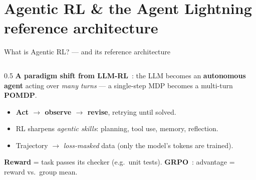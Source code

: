 \documentclass[aspectratio=169]{beamer}
\begin{document}
\section{Agentic RL \& the Agent Lightning reference architecture}

\begin{frame}{What is Agentic RL? --- and its reference architecture}
  \begin{columns}[T]
    \begin{column}{0.5\textwidth}
      \footnotesize
      \textbf{A paradigm shift from LLM-RL}~\cite{agenticrl}: the LLM becomes an
      \textbf{autonomous agent} acting over \emph{many turns} --- a single-step MDP becomes a
      multi-turn \textbf{POMDP}.
      \begin{itemize}\setlength\itemsep{0.12em}
        \item \textbf{Act $\to$ observe $\to$ revise}, retrying until solved.
        \item RL sharpens \emph{agentic skills}: planning, tool use, memory, reflection.
        \item Trajectory $\to$ \emph{loss-masked} data (only the model's tokens are trained).
      \end{itemize}
      \vspace{0.1em}
      {\scriptsize \textbf{Reward} = task passes its checker (e.g.\ unit tests).
      \textbf{GRPO}~\cite{grpo}: advantage = reward vs.\ group mean.}
      \vspace{0.3em}
      \begin{center}
\end{center}
\end{column}
\end{columns}
\end{frame}
\end{document}
